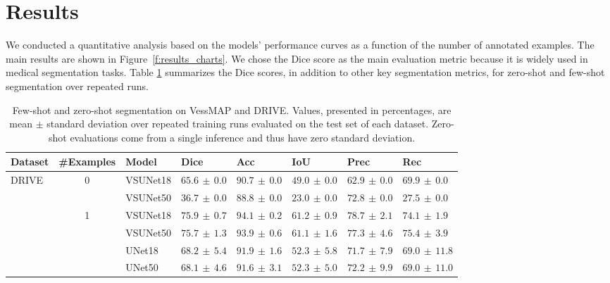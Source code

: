 \documentclass[%
reprint,
nofootinbib,
 amsmath,amssymb,
aps,
superscriptaddress,
showkeys,
longbibliography
]{revtex4-1}
\begin{document}
\section{Results}
\label{s:results}

We conducted a quantitative analysis based on the models' performance curves as a function of the number of annotated examples. The main results are shown in Figure~\ref{f:results_charts}. We chose the Dice score as the main evaluation metric because it is widely used in medical segmentation tasks. Table \ref{tab:combined_fewshot_percent} summarizes the Dice scores, in addition to other key segmentation metrics, for zero-shot and few-shot segmentation over repeated runs.

\begin{table}[t]
    \caption{Few-shot and zero-shot segmentation on VessMAP and DRIVE. Values, presented in percentages, are mean $\pm$ standard deviation over repeated training runs evaluated on the test set of each dataset. Zero-shot evaluations come from a single inference and thus have zero standard deviation.}
    \label{tab:combined_fewshot_percent}
    \centering
    \begingroup
    \small
    \setlength{\tabcolsep}{4pt}
    \renewcommand{\arraystretch}{1.15}
    \begin{tabular}{l c l l l l l l}
        \hline
        \textbf{Dataset} & \textbf{\#Examples} & \textbf{Model} & \textbf{Dice} & \textbf{Acc} & \textbf{IoU} & \textbf{Prec} & \textbf{Rec} \\
        \hline
        \multirow{10}{*}{DRIVE} & \multirow{2}{*}{0} & VSUNet18 & $\mathbf{65.6} \,\pm\, 0.0$ & $90.7 \,\pm\, 0.0$ & $49.0 \,\pm\, 0.0$ & $62.9 \,\pm\, 0.0$ & $69.9 \,\pm\, 0.0$ \\
         &  & VSUNet50 & $36.7 \,\pm\, 0.0$ & $88.8 \,\pm\, 0.0$ & $23.0 \,\pm\, 0.0$ & $72.8 \,\pm\, 0.0$ & $27.5 \,\pm\, 0.0$ \\
         \cline{2-8}
         & \multirow{4}{*}{1} & VSUNet18 & $\mathbf{75.9} \,\pm\, 0.7$ & $94.1 \,\pm\, 0.2$ & $61.2 \,\pm\, 0.9$ & $78.7 \,\pm\, 2.1$ & $74.1 \,\pm\, 1.9$ \\
         &  & VSUNet50 & $75.7 \,\pm\, 1.3$ & $93.9 \,\pm\, 0.6$ & $61.1 \,\pm\, 1.6$ & $77.3 \,\pm\, 4.6$ & $75.4 \,\pm\, 3.9$ \\
         &  & UNet18 & $68.2 \,\pm\, 5.4$ & $91.9 \,\pm\, 1.6$ & $52.3 \,\pm\, 5.8$ & $71.7 \,\pm\, 7.9$ & $69.0 \,\pm\, 11.8$ \\
         &  & UNet50 & $68.1 \,\pm\, 4.6$ & $91.6 \,\pm\, 3.1$ & $52.3 \,\pm\, 5.0$ & $72.2 \,\pm\, 9.9$ & $69.0 \,\pm\, 11.0$ \\

\end{tabular}
\end{table}
\end{document}

